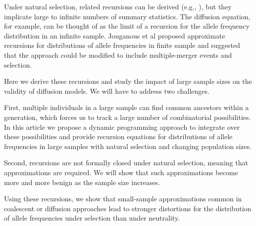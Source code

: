 \documentclass[9pt,twocolumn,twoside,lineno]{gsajnl}
\begin{document}
Under natural selection, related recursions can be derived (e.g., \cite{Donelly, Krone1997, Jouganous}), but they implicate large to infinite numbers of summary statistics. The diffusion equation, for example, can be thought of as the limit of a recursion for the allele frequency distribution in an infinite sample. Jouganous et al \cite{JouganousEtAl2017} proposed approximate recursions for distributions of allele frequencies in finite sample and suggested that the approach could be modified to include multiple-merger events and selection.  

Here we derive these recursions and study the impact of large sample sizes on the validity of diffusion models. We will have to address two challenges. 

First, multiple individuals in a large sample can find common ancestors within a generation, which forces us to track a large number of combinatorial possibilities.  In this article we propose a dynamic programming approach to integrate over these possibilities and provide recursion equations for distributions of allele frequencies in large samples with natural selection and changing population sizes. 

Second, recursions are not formally closed under natural selection, meaning that approximations are required. We will show that such approximations become more and more benign as the sample size increases. 

Using these recursions, we show that small-sample approximations common in coalescent or diffusion approaches lead to stronger distortions for the distribution of allele frequencies under selection than under neutrality. 
\end{document}
